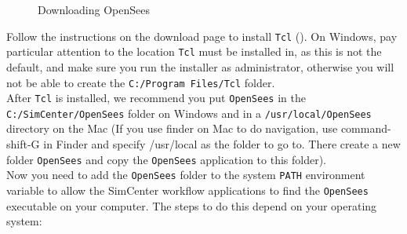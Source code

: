 \begin{figure}[!htbp]
  \caption{Downloading OpenSees}
  \label{fig:openseesDownload}
\end{figure}

Follow the instructions on the download page to install \texttt{Tcl}
(). On Windows, pay particular
attention to the location \texttt{Tcl} must be installed in, as this is not the
default, and make sure you run the installer as administrator,
otherwise you will not be able to create the \texttt{C:/Program
Files/Tcl} folder.\\

After \texttt{Tcl} is installed, we recommend you put \texttt{OpenSees} in
the \texttt{C:/SimCenter/OpenSees} folder on Windows and in
a \texttt{/usr/local/OpenSees} directory on the Mac (If you use finder
on Mac to do navigation, use command-shift-G in Finder and specify
/usr/local as the folder to go to. There create a new folder \texttt{OpenSees}
and copy the \texttt{OpenSees} application to this folder).\\


Now you need to add the \texttt{OpenSees} folder to the
system \texttt{PATH} environment variable to allow the SimCenter
workflow applications to find the \texttt{OpenSees} executable on your
computer. The steps to do this depend on your operating system:

